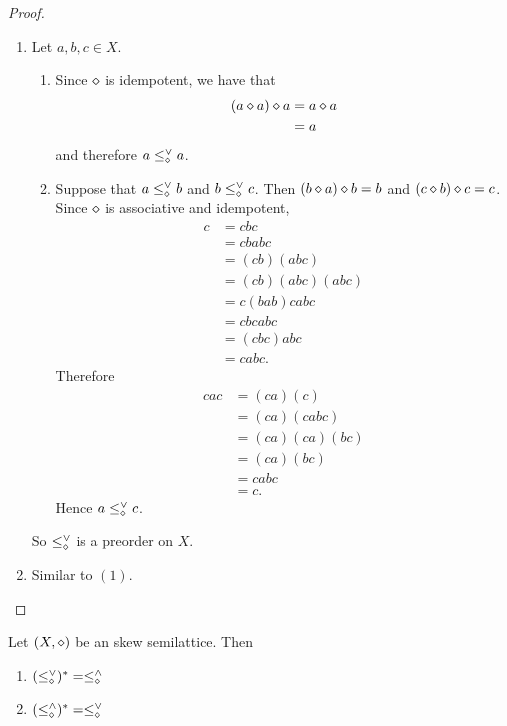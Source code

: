 \documentclass{book}
\begin{document}
	\begin{proof}\
		\begin{enumerate}
			\item Let $a,b,c \in X$.
			\begin{enumerate}
				\item Since $\diamond$ is idempotent, we have that 
				\begin{align*}
					(a \diamond a) \diamond a
					& = a \diamond a \\
					& = a
				\end{align*}
				and therefore $a \leq^{\vee}_{\diamond} a$. 
				\item Suppose that $a \leq^{\vee}_{\diamond} b$ and $b \leq^{\vee}_{\diamond} c$. Then $(b \diamond a) \diamond b = b$ and $(c \diamond b) \diamond c = c$. Since $\diamond$ is associative and idempotent,
				\begin{align*}
					c 
					& = cbc \\
					& = cbabc \\
					& = (cb)(abc) \\
					& = (cb)(abc)(abc) \\
					& = c(bab)cabc \\
					& = cbcabc \\
					& = (cbc)abc \\
					& = cabc.
				\end{align*}
				Therefore 
				\begin{align*}
					cac
					& = (ca)(c) \\
					& = (ca)(cabc) \\
					& = (ca)(ca)(bc) \\
					& = (ca)(bc) \\
					& = cabc \\
					& = c. 
				\end{align*}
				Hence $a \leq^{\vee}_{\diamond} c$.
			\end{enumerate}
			So $\leq^{\vee}_{\diamond}$ is a preorder on $X$.
			\item Similar to $(1)$.
		\end{enumerate}
	\end{proof}
	
	\begin{ex} 
		Let $(X, \diamond)$ be an skew semilattice. Then 
		\begin{enumerate}
			\item $(\leq^{\vee}_{\diamond})^* = \leq^{\wedge}_{\diamond}$
			\item $(\leq^{\wedge}_{\diamond})^* = \leq^{\vee}_{\diamond}$
		\end{enumerate}
	\end{ex}
	
\end{document}
